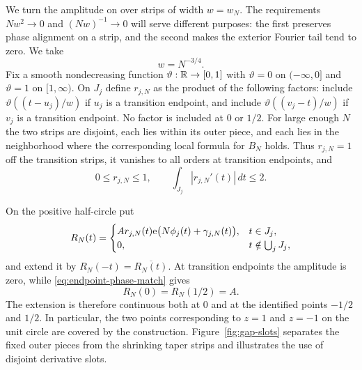We turn the amplitude on over strips of width $w=w_N$.  The requirements
$Nw^2\to0$ and $(Nw)^{-1}\to0$ will serve different purposes: the first
preserves phase alignment on a strip, and the second makes the exterior
Fourier tail tend to zero.  We take
\begin{equation}\label{eq:taper-width}
 w=N^{-3/4}.
\end{equation}
Fix a smooth nondecreasing function $\vartheta:\mathbb R\to[0,1]$ with $\vartheta=0$ on
$(-\infty,0]$ and $\vartheta=1$ on $[1,\infty)$.  On $J_j$ define
$r_{j,N}$ as the product of the following factors: include
$\vartheta((t-u_j)/w)$ if $u_j$ is a transition endpoint, and include
$\vartheta((v_j-t)/w)$ if $v_j$ is a transition endpoint.  No factor is included
at $0$ or $1/2$.  For large enough $N$ the two strips are disjoint, each
lies within its outer piece, and each lies in the neighborhood where the
corresponding local formula for $B_N$ holds.  Thus $r_{j,N}=1$ off the
transition strips, it vanishes to all orders at transition endpoints, and
\begin{equation}\label{eq:taper-variation}
 0\le r_{j,N}\le1,
 \qquad \int_{J_j}|r_{j,N}'(t)|\,dt\le2.
\end{equation}

On the positive half-circle put
\begin{equation}\label{eq:correction-definition}
 R_N(t)=
 \begin{cases}
 A r_{j,N}(t)\mathrm e\bigl(N\phi_j(t)+\gamma_{j,N}(t)\bigr),&t\in J_j,\\
 0,&t\notin\bigcup_j J_j,
 \end{cases}
\end{equation}
and extend it by $R_N(-t)=\overline{R_N(t)}$.  At transition endpoints the
amplitude is zero, while \eqref{eq:endpoint-phase-match} gives
\begin{equation}\label{eq:reflection-values}
 R_N(0)=R_N(1/2)=A.
\end{equation}
The extension is therefore continuous both at $0$ and at the identified
points $-1/2$ and $1/2$.  In particular, the two points corresponding to
$z=1$ and $z=-1$ on the unit circle are covered by the construction.
Figure~\ref{fig:gap-slots} separates the fixed outer pieces from the
shrinking taper strips and illustrates the use of disjoint derivative
slots.



